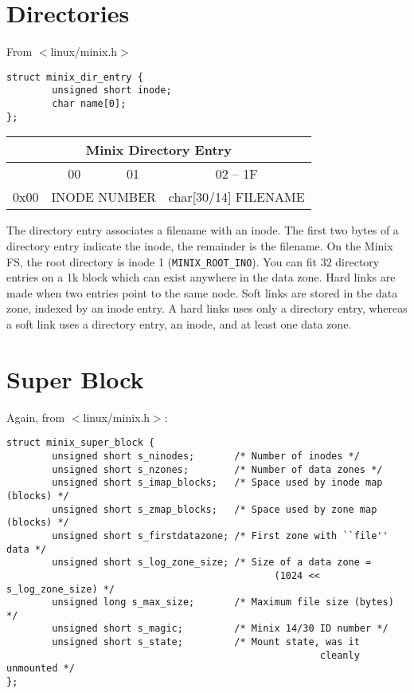 \section{Directories}

From $<$linux/minix.h$>$

\begin{verbatim}
struct minix_dir_entry {
        unsigned short inode;
        char name[0];
};
\end{verbatim}

\begin{center}
\begin{tabular}{|r||c|c|c|}
\hline
\multicolumn{4}{|c|}{Minix Directory Entry}
  \\ \hline\hline
 & 00 & 01 & 02 -- 1F \\ \hline
0x00 & \multicolumn{2}{c|}{INODE NUMBER} & char[30/14] FILENAME \\ \hline
\end{tabular}
\end{center}

The directory entry associates a filename with an inode.  The first two
bytes of a directory entry indicate the inode, the remainder is the 
filename.  On the Minix FS, the root directory is inode 1 
({\tt MINIX\_ROOT\_INO}).  You can fit 32 directory entries on a 1k block
which can exist anywhere in the data zone.  Hard links are made when two
entries point to the same node.  Soft links are stored in the data zone,
indexed by an inode entry.  A hard links uses only a directory entry, 
whereas a soft link uses a directory entry, an inode, and at least one
data zone.

\section{Super Block}

Again, from $<$linux/minix.h$>$:

\begin{verbatim}
struct minix_super_block {
        unsigned short s_ninodes;       /* Number of inodes */
        unsigned short s_nzones;        /* Number of data zones */
        unsigned short s_imap_blocks;   /* Space used by inode map (blocks) */
        unsigned short s_zmap_blocks;   /* Space used by zone map  (blocks) */
        unsigned short s_firstdatazone; /* First zone with ``file'' data */
        unsigned short s_log_zone_size; /* Size of a data zone =
                                               (1024 << s_log_zone_size) */
        unsigned long s_max_size;       /* Maximum file size (bytes) */
        unsigned short s_magic;         /* Minix 14/30 ID number */
        unsigned short s_state;         /* Mount state, was it
                                                       cleanly unmounted */
};
\end{verbatim}

